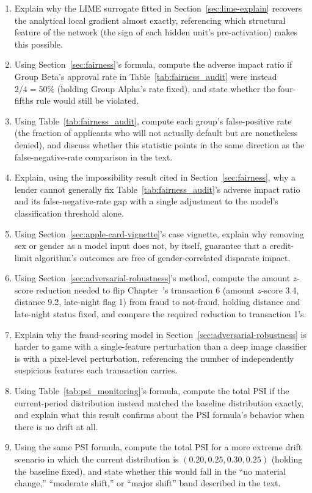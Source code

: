 \documentclass[../ai_in_finance]{subfiles}
\begin{document}
\begin{enumerate}[exercises]
    \item Explain why the LIME surrogate fitted in Section~\ref{sec:lime-explain} recovers the analytical local gradient almost exactly, referencing which structural feature of the network (the sign of each hidden unit's pre-activation) makes this possible.
    \item Using Section~\ref{sec:fairness}'s formula, compute the adverse impact ratio if Group Beta's approval rate in Table~\ref{tab:fairness_audit} were instead $2/4 = 50\%$ (holding Group Alpha's rate fixed), and state whether the four-fifths rule would still be violated.
    \item Using Table~\ref{tab:fairness_audit}, compute each group's false-positive rate (the fraction of applicants who will not actually default but are nonetheless denied), and discuss whether this statistic points in the same direction as the false-negative-rate comparison in the text.
    \item Explain, using the impossibility result cited in Section~\ref{sec:fairness}, why a lender cannot generally fix Table~\ref{tab:fairness_audit}'s adverse impact ratio and its false-negative-rate gap with a single adjustment to the model's classification threshold alone.
    \item Using Section~\ref{sec:apple-card-vignette}'s case vignette, explain why removing sex or gender as a model input does not, by itself, guarantee that a credit-limit algorithm's outcomes are free of gender-correlated disparate impact.
    \item Using Section~\ref{sec:adversarial-robustness}'s method, compute the amount $z$-score reduction needed to flip Chapter~'s transaction 6 (amount $z$-score 3.4, distance 9.2, late-night flag 1) from fraud to not-fraud, holding distance and late-night status fixed, and compare the required reduction to transaction 1's.
    \item Explain why the fraud-scoring model in Section~\ref{sec:adversarial-robustness} is harder to game with a single-feature perturbation than a deep image classifier is with a pixel-level perturbation, referencing the number of independently suspicious features each transaction carries.
    \item Using Table~\ref{tab:psi_monitoring}'s formula, compute the total PSI if the current-period distribution instead matched the baseline distribution exactly, and explain what this result confirms about the PSI formula's behavior when there is no drift at all.
    \item Using the same PSI formula, compute the total PSI for a more extreme drift scenario in which the current distribution is $(0.20, 0.25, 0.30, 0.25)$ (holding the baseline fixed), and state whether this would fall in the ``no material change,'' ``moderate shift,'' or ``major shift'' band described in the text.

\end{enumerate}
\end{document}
